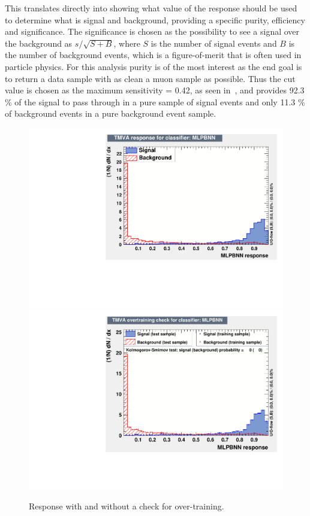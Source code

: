 This translates directly into  showing what value of the response should be used to determine what is signal and background, providing a specific purity, efficiency and significance. The significance is chosen as the possibility to see a signal over the background as $s/\sqrt{S+B}$, where $S$ is the number of signal events and $B$ is the number of background events, which is a figure-of-merit that is often used in particle physics. For this analysis purity is of the most interest as the end goal is to return a data sample with as clean a muon sample as possible. Thus the cut value is chosen as the maximum sensitivity = 0.42, as seen in~, and provides 92.3 \% of the signal to pass through in a pure sample of signal events and only 11.3 \% of background events in a pure background event sample.

\begin{figure}[h!]
\centering
\includegraphics[width=.5\textwidth]{figures/TMVA/responceTest.pdf}
\includegraphics[width=.48\textwidth]{figures/TMVA/responceTestOT.pdf}
\caption{Response with and without a check for over-training.}
\label{fig:TMVAresponce}
\end{figure}

